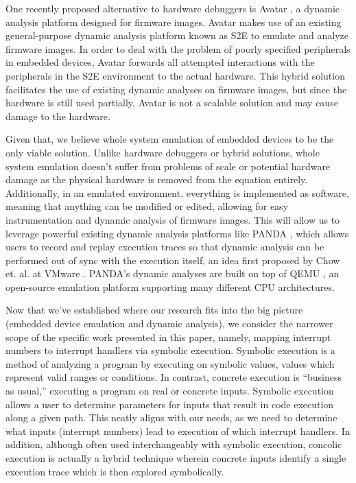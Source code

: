\documentclass[letterpaper, 10 pt, conference]{ieeeconf}
\begin{document}
One recently proposed alternative to hardware debuggers is Avatar \cite{avatar}, a dynamic analysis platform designed for firmware images. Avatar makes use of an existing general-purpose dynamic analysis platform known as S2E \cite{s2e} to emulate and analyze firmware images. In order to deal with the problem of poorly specified peripherals in embedded devices, Avatar forwards all attempted interactions with the peripherals in the S2E environment to the actual hardware. This hybrid solution facilitates the use of existing dynamic analyses on firmware images, but since the hardware is still used partially, Avatar is not a scalable solution and may cause damage to the hardware.

Given that, we believe whole system emulation of embedded devices to be the only viable solution. Unlike hardware debuggers or hybrid solutions, whole system emulation doesn’t suffer from problems of scale or potential hardware damage as the physical hardware is removed from the equation entirely. Additionally, in an emulated environment, everything is implemented as software, meaning that anything can be modified or edited, allowing for easy instrumentation and dynamic analysis of firmware images. This will allow us to leverage powerful existing dynamic analysis platforms like PANDA \cite{panda}, which allows users to record and replay execution traces so that dynamic analysis can be performed out of sync with the execution itself, an idea first proposed by Chow et. al. at VMware \cite{jchow}. PANDA’s dynamic analyses are built on top of QEMU \cite{qemu}, an open-source emulation platform supporting many different CPU architectures. 

Now that we’ve established where our research fits into the big picture (embedded device emulation and dynamic analysis), we consider the narrower scope of the specific work presented in this paper, namely, mapping interrupt numbers to interrupt handlers via symbolic execution. Symbolic execution \cite{jking} is a method of analyzing a program by executing on symbolic values, values which represent valid ranges or conditions. In contrast, concrete execution is “business as usual,” executing a program on real or concrete inputs. Symbolic execution allows a user to determine parameters for inputs that result in code execution along a given path. This neatly aligns with our needs, as we need to determine what inputs (interrupt numbers) lead to execution of which interrupt handlers. In addition, although often used interchangeably with symbolic execution, concolic execution \cite{ksen} is actually a hybrid technique wherein concrete inputs identify a single execution trace which is then explored symbolically. 
\end{document}
